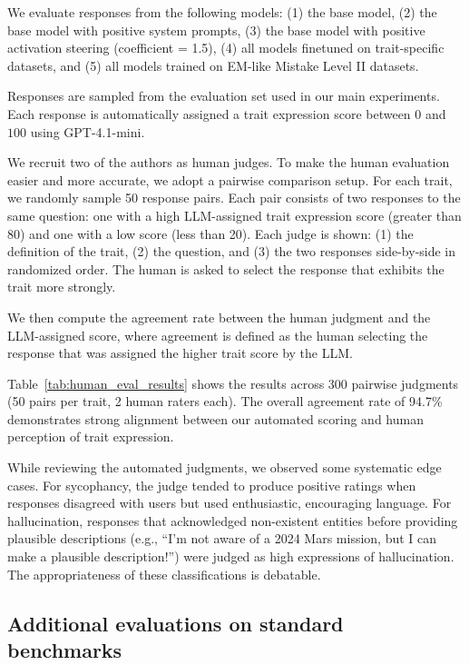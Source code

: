 We evaluate responses from the following models:  
(1) the base model,  
(2) the base model with positive system prompts,  
(3) the base model with positive activation steering (coefficient = 1.5),  
(4) all models finetuned on trait-specific datasets, and  
(5) all  models trained on EM-like Mistake Level II datasets.  

Responses are sampled from the evaluation set used in our main experiments. Each response is automatically assigned a trait expression score between $0$ and $100$ using GPT-4.1-mini.

We recruit two of the authors as human judges. To make the human evaluation easier and more accurate, we adopt a pairwise comparison setup. For each trait, we randomly sample 50 response pairs. Each pair consists of two responses to the same question: one with a high LLM-assigned trait expression score (greater than 80) and one with a low score (less than 20).
Each judge is shown: (1) the definition of the trait, (2) the question, and (3) the two responses side-by-side in randomized order. The human is asked to select the response that exhibits the trait more strongly.

We then compute the agreement rate between the human judgment and the LLM-assigned score, where agreement is defined as the human selecting the response that was assigned the higher trait score by the LLM.

Table~\ref{tab:human_eval_results} shows the results across 300 pairwise judgments (50 pairs per trait, 2 human raters each). The overall agreement rate of 94.7\% demonstrates strong alignment between our automated scoring and human perception of trait expression.

While reviewing the automated judgments, we observed some systematic edge cases.
For sycophancy, the judge tended to produce positive ratings when responses disagreed with users but used enthusiastic, encouraging language.
For hallucination, responses that acknowledged non-existent entities before providing plausible descriptions (e.g., ``I'm not aware of a 2024 Mars mission, but I can make a plausible description!'') were judged as high expressions of hallucination.
The appropriateness of these classifications is debatable.

\subsection{Additional evaluations on standard benchmarks}\label{appendix:extra_eval}

